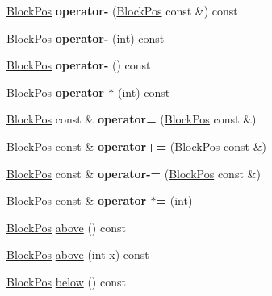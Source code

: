 \begin{DoxyCompactItemize}
\mbox{\hyperlink{struct_block_pos}{Block\+Pos}} {\bfseries operator-\/} (\mbox{\hyperlink{struct_block_pos}{Block\+Pos}} const \&) const
\item 
\mbox{\label{struct_block_pos_a1d5402e118f611193a890a7abb34151d}} 
\mbox{\hyperlink{struct_block_pos}{Block\+Pos}} {\bfseries operator-\/} (int) const
\item 
\mbox{\label{struct_block_pos_a5a9a462dc34d03bda22379dfc5885535}} 
\mbox{\hyperlink{struct_block_pos}{Block\+Pos}} {\bfseries operator-\/} () const
\item 
\mbox{\label{struct_block_pos_a2542afde75d136d82606aabae967a440}} 
\mbox{\hyperlink{struct_block_pos}{Block\+Pos}} {\bfseries operator $\ast$} (int) const
\item 
\mbox{\label{struct_block_pos_ad3186a730baf1e768e20463c1fee9b0b}} 
\mbox{\hyperlink{struct_block_pos}{Block\+Pos}} const  \& {\bfseries operator=} (\mbox{\hyperlink{struct_block_pos}{Block\+Pos}} const \&)
\item 
\mbox{\label{struct_block_pos_a1440c700dddf4338bc9af4b4921e0ba6}} 
\mbox{\hyperlink{struct_block_pos}{Block\+Pos}} const  \& {\bfseries operator+=} (\mbox{\hyperlink{struct_block_pos}{Block\+Pos}} const \&)
\item 
\mbox{\label{struct_block_pos_a234e877658def6c301bf479c2dc5b066}} 
\mbox{\hyperlink{struct_block_pos}{Block\+Pos}} const  \& {\bfseries operator-\/=} (\mbox{\hyperlink{struct_block_pos}{Block\+Pos}} const \&)
\item 
\mbox{\label{struct_block_pos_a7a6ef96e37762d4a2c141baa4cc6eaa6}} 
\mbox{\hyperlink{struct_block_pos}{Block\+Pos}} const  \& {\bfseries operator $\ast$=} (int)
\item 
\mbox{\hyperlink{struct_block_pos}{Block\+Pos}} \mbox{\hyperlink{struct_block_pos_a6586d39744d7f375e04a4f893cbf0372}{above}} () const
\item 
\mbox{\hyperlink{struct_block_pos}{Block\+Pos}} \mbox{\hyperlink{struct_block_pos_a226d6174b5f844e3ec240386e3edff49}{above}} (int x) const
\item 
\mbox{\hyperlink{struct_block_pos}{Block\+Pos}} \mbox{\hyperlink{struct_block_pos_afa00519389de3ea611d087e4351cca69}{below}} () const

\end{DoxyCompactItemize}
